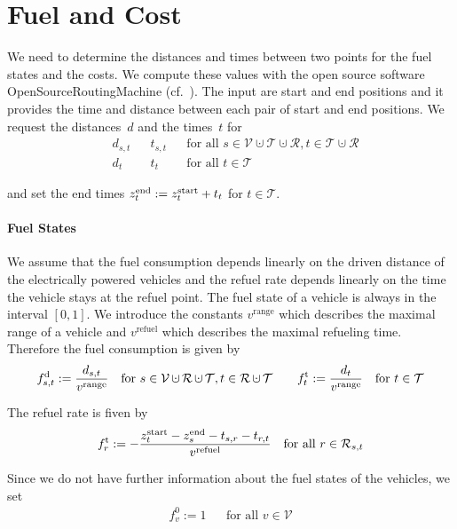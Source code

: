 \section{Fuel and Cost}

We need to determine the distances and times between two points for the fuel states and the costs. We compute these values with the open source software OpenSourceRoutingMachine (cf.~\cite{OSRM}). The input are start and end positions and it provides the time and distance between each pair of start and end positions. We request the distances~$d$ and the times~$t$ for
\begin{align*}
	& d_{s,t} && t_{s,t} && \text{for all } s\in\mathcal{V}\cupdot\mathcal{T}\cupdot\mathcal{R}, t\in\mathcal{T}\cupdot\mathcal{R} \\
	& d_t && t_t && \text{for all } t\in\mathcal{T}
\end{align*}

and set the end times ${z^{\operatorname{end}}_t := z^{\operatorname{start}}_t + t_t}$ for ${t\in\mathcal{T}}$.

\paragraph{Fuel States} \parfill

We assume that the fuel consumption depends linearly on the driven distance of the electrically powered vehicles and the refuel rate depends linearly on the time the vehicle stays at the refuel point. The fuel state of a vehicle is always in the interval $[0,1]$. We introduce the constants $v^{\operatorname{range}}$ which describes the maximal range of a vehicle and $v^{\operatorname{refuel}}$ which describes the maximal refueling time. Therefore the fuel consumption is given by
\begin{align*}
	\fd_{s,t} := \frac{d_{s,t}}{v^{\operatorname{range}}} && \text{for } s\in\mathcal{V}\cupdot\mathcal{R}\cupdot\mathcal{T}, t\in\mathcal{R}\cupdot\mathcal{T} && && \ft_t := \frac{d_t}{v^{\operatorname{range}}} && \text{for } t\in\mathcal{T}
\end{align*}

The refuel rate is fiven by
\begin{align*}
	f^{\operatorname{t}}_r := -\frac{z^{\operatorname{start}}_t - z^{\operatorname{end}}_s - t_{s,r} - t_{r,t}}{v^{\operatorname{refuel}}} && \text{for all } r\in\mathcal{R}_{s,t}
\end{align*}

Since we do not have further information about the fuel states of the vehicles, we set
\begin{align*}
	f^0_v := 1 && \text{for all } v\in\mathcal{V}
\end{align*}


